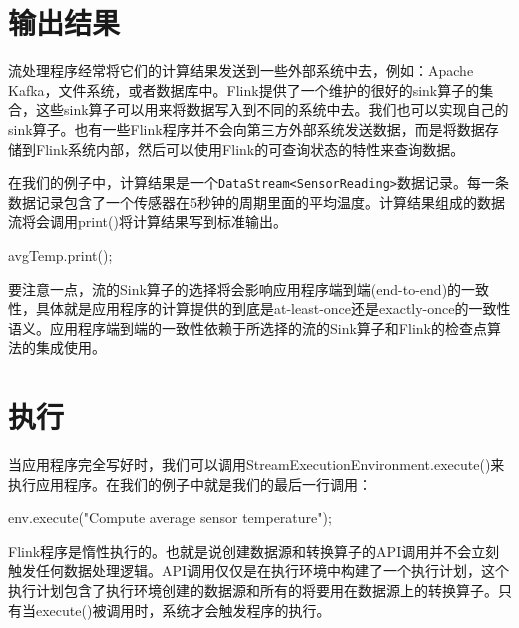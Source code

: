 \documentclass[cn,11pt,chinese]{elegantbook}
\newenvironment{Shaded}{}{}
\newcommand{\FunctionTok}[1]{\textcolor[rgb]{0.02,0.16,0.49}{#1}}
\newcommand{\NormalTok}[1]{#1}
\newcommand{\StringTok}[1]{\textcolor[rgb]{0.25,0.44,0.63}{#1}}
\renewenvironment{quote}{\begin{customblockquote}\list{}{\rightmargin=0em\leftmargin=0em}%
\item\relax\color{blockquote-text}\ignorespaces}{\unskip\unskip\endlist\end{customblockquote}}
\begin{document}
\hypertarget{ux8f93ux51faux7ed3ux679c}{%
\section{输出结果}\label{ux8f93ux51faux7ed3ux679c}}

流处理程序经常将它们的计算结果发送到一些外部系统中去，例如：Apache
Kafka，文件系统，或者数据库中。Flink提供了一个维护的很好的sink算子的集合，这些sink算子可以用来将数据写入到不同的系统中去。我们也可以实现自己的sink算子。也有一些Flink程序并不会向第三方外部系统发送数据，而是将数据存储到Flink系统内部，然后可以使用Flink的可查询状态的特性来查询数据。

在我们的例子中，计算结果是一个\texttt{DataStream\textless{}SensorReading\textgreater{}}数据记录。每一条数据记录包含了一个传感器在5秒钟的周期里面的平均温度。计算结果组成的数据流将会调用print()将计算结果写到标准输出。

\begin{Shaded}
\begin{Highlighting}[]
\NormalTok{avgTemp.}\FunctionTok{print}\NormalTok{();}
\end{Highlighting}
\end{Shaded}

\begin{quote}
要注意一点，流的Sink算子的选择将会影响应用程序端到端(end-to-end)的一致性，具体就是应用程序的计算提供的到底是at-least-once还是exactly-once的一致性语义。应用程序端到端的一致性依赖于所选择的流的Sink算子和Flink的检查点算法的集成使用。
\end{quote}

\hypertarget{ux6267ux884c}{%
\section{执行}\label{ux6267ux884c}}

当应用程序完全写好时，我们可以调用StreamExecutionEnvironment.execute()来执行应用程序。在我们的例子中就是我们的最后一行调用：

\begin{Shaded}
\begin{Highlighting}[]
\NormalTok{env.}\FunctionTok{execute}\NormalTok{(}\StringTok{"Compute average sensor temperature"}\NormalTok{);}
\end{Highlighting}
\end{Shaded}

Flink程序是惰性执行的。也就是说创建数据源和转换算子的API调用并不会立刻触发任何数据处理逻辑。API调用仅仅是在执行环境中构建了一个执行计划，这个执行计划包含了执行环境创建的数据源和所有的将要用在数据源上的转换算子。只有当execute()被调用时，系统才会触发程序的执行。
\end{document}

